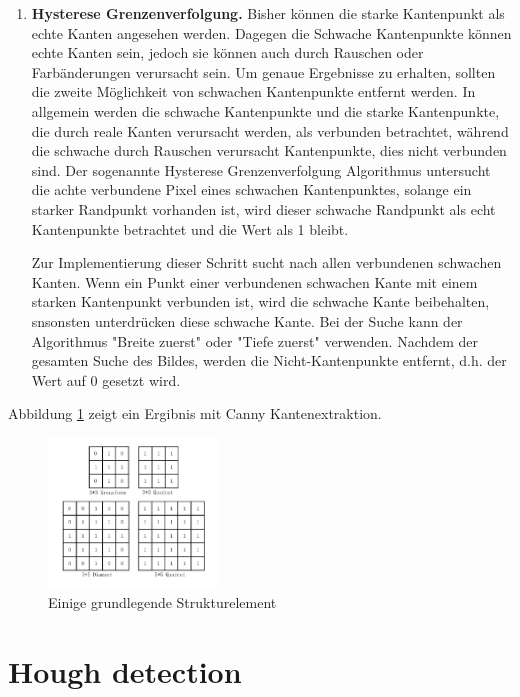\begin{enumerate}
	\item \textbf{Hysterese Grenzenverfolgung.} Bisher können die starke Kantenpunkt als echte Kanten angesehen werden. Dagegen die Schwache Kantenpunkte können echte Kanten sein, jedoch sie können auch durch Rauschen oder Farbänderungen verursacht sein. Um genaue Ergebnisse zu erhalten, sollten die zweite Möglichkeit von schwachen Kantenpunkte entfernt werden. In allgemein werden die schwache Kantenpunkte und die starke Kantenpunkte, die durch reale Kanten verursacht werden, als verbunden betrachtet, während die schwache durch Rauschen verursacht Kantenpunkte, dies nicht verbunden sind. Der sogenannte Hysterese Grenzenverfolgung Algorithmus untersucht die achte verbundene Pixel eines schwachen Kantenpunktes, solange ein starker Randpunkt vorhanden ist, wird dieser schwache Randpunkt als echt Kantenpunkte betrachtet und die Wert als 1 bleibt.
	
Zur Implementierung dieser Schritt sucht nach allen verbundenen schwachen Kanten. Wenn ein Punkt einer verbundenen schwachen Kante mit einem starken Kantenpunkt verbunden ist, wird die schwache Kante beibehalten, snsonsten unterdrücken diese schwache Kante. Bei der Suche kann der Algorithmus "Breite zuerst" oder "Tiefe zuerst" verwenden. Nachdem der gesamten Suche des Bildes, werden die Nicht-Kantenpunkte entfernt, d.h. der Wert  auf 0 gesetzt wird.
	
\end{enumerate}

Abbildung \ref{fig:canny} zeigt ein Ergibnis mit Canny Kantenextraktion.

\begin{figure}[H]
 \centering 
  \includegraphics[keepaspectratio,width=0.4\textwidth]{images/4_ZweiteErfahrung/Canny/canny.pdf}
 \caption{Einige grundlegende Strukturelement}
 \label{fig:canny}
\end{figure} 

\section{Hough detection}




